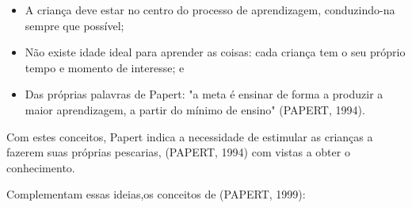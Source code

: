 \begin{itemize}
\item A criança deve estar no centro do processo de aprendizagem, conduzindo-na sempre que possível;
\item Não existe idade ideal para aprender as coisas: cada criança tem o seu próprio tempo e momento de interesse; e
\item Das próprias palavras de Papert: "a meta é ensinar de forma a produzir a maior aprendizagem, a partir do mínimo de ensino"  (PAPERT, 1994).
\end{itemize}

Com estes conceitos, Papert indica a necessidade de estimular as crianças a fazerem suas próprias pescarias,  (PAPERT, 1994) com vistas a obter o conhecimento.

Complementam essas ideias,os conceitos de (PAPERT, 1999):


